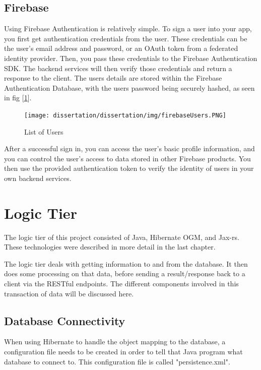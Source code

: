 \subsection{Firebase}
\label{sec:SystemDesignFirebase}
Using Firebase Authentication is relatively simple. To sign a user into your app, you first get authentication credentials from the user. These credentials can be the user's email address and password, or an OAuth token from a federated identity provider. Then, you pass these credentials to the Firebase Authentication SDK. The backend services will then verify those credentials and return a response to the client. The users details are stored within the Firebase Authentication Database, with the users password being securely hashed, as seen in fig [\ref{fig:listUsers}].

\begin{figure}[H]
    \centering
    \texttt{[image: dissertation/dissertation/img/firebaseUsers.PNG]}
    \caption{List of Users}
    \label{fig:listUsers}
\end{figure}


After a successful sign in, you can access the user's basic profile information, and you can control the user's access to data stored in other Firebase products. You then use the provided authentication token to verify the identity of users in your own backend services.


\section{Logic Tier}
\label{sec:SystemDesignLogic}

The logic tier of this project consisted of Java, Hibernate OGM, and Jax-rs. These technologies were described in more detail in the last chapter. 

The logic tier deals with getting information to and from the database. It then does some processing on that data, before sending a result/response back to a client via the RESTful endpoints. The different components involved in this transaction of data will be discussed here. 

\subsection{Database Connectivity}
\label{sec:SystemDesignDatabaseConnectivity}

\bigskip

When using Hibernate to handle the object mapping to the database, a configuration file needs to be created in order to tell that Java program what database to connect to. This configuration file is called "persistence.xml".

